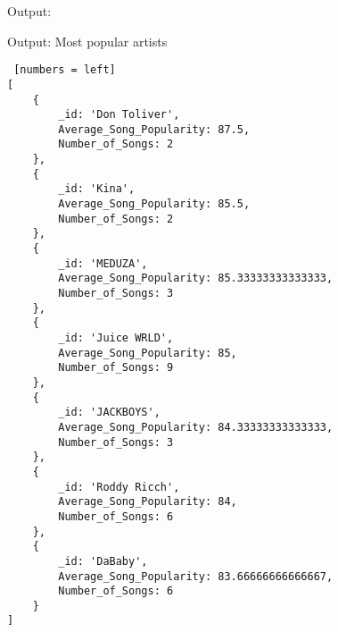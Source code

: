 \documentclass{Configuration_Files/PoliMi3i_thesis}
\begin{document}
Output:
\begin{algorithm}[h!]
\caption{Output: Most popular artists}
\begin{lstlisting} [numbers = left]
[
	{
		_id: 'Don Toliver',
		Average_Song_Popularity: 87.5,
		Number_of_Songs: 2
	},
	{
		_id: 'Kina',
		Average_Song_Popularity: 85.5,
		Number_of_Songs: 2 
	},
	{
		_id: 'MEDUZA',
		Average_Song_Popularity: 85.33333333333333,
		Number_of_Songs: 3
	},
	{
		_id: 'Juice WRLD',
		Average_Song_Popularity: 85,
		Number_of_Songs: 9
	},
	{
		_id: 'JACKBOYS',
		Average_Song_Popularity: 84.33333333333333,
		Number_of_Songs: 3
	},
	{
		_id: 'Roddy Ricch',
		Average_Song_Popularity: 84,
		Number_of_Songs: 6
	},
	{
		_id: 'DaBaby',
		Average_Song_Popularity: 83.66666666666667,
		Number_of_Songs: 6
	}
]
\end{lstlisting}
\end{algorithm}



\end{document}
